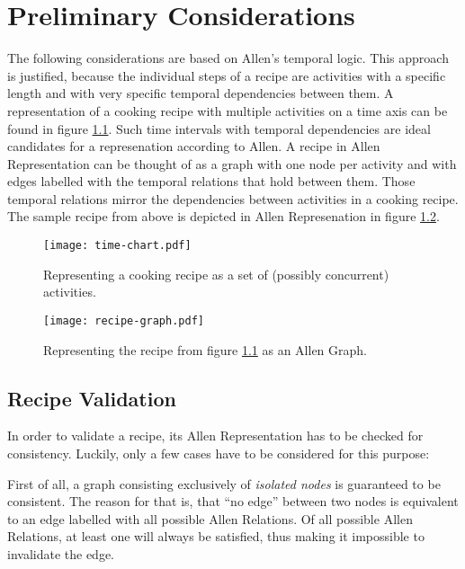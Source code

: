 \chapter{Preliminary Considerations}

    The  following considerations are based on Allen's temporal logic. This
    approach is justified, because the individual steps of a recipe are
    activities with a specific length and with very specific temporal dependencies
    between them. A representation of a cooking recipe with multiple
    activities on a time axis can be found in figure \ref{fig:time-chart}. Such
    time intervals with temporal dependencies are ideal candidates for a
    represenation according to Allen. A recipe in Allen Representation can be
    thought of as a graph with one node
    per activity and with edges
    labelled with the temporal relations that hold between them. Those temporal
    relations mirror the dependencies between activities in a cooking recipe.
    The sample recipe from above is depicted in Allen Represenation in figure
    \ref{fig:graph}.
    
    \begin{figure}[]
     \centering
     \texttt{[image: time-chart.pdf]}
     \caption[Recipe time chart]{Representing a cooking recipe as a set of
     (possibly concurrent) activities.}
     \label{fig:time-chart}
    \end{figure}
    
    \begin{figure}[]
     \centering
     \texttt{[image: recipe-graph.pdf]}
     \caption[Recipe graph]{Representing the recipe from figure
     \ref{fig:time-chart} as an Allen Graph.}
     \label{fig:graph}
    \end{figure}
    
    \section{Recipe Validation}
    
    In order to validate a recipe, its Allen Representation has to be checked
    for consistency. Luckily, only a few cases have to be considered for this
    purpose:
    
    First of all, a graph consisting exclusively of \emph{isolated nodes}
    is guaranteed to be consistent. The reason for that is, that ``no edge''
    between two nodes is equivalent to an edge labelled with all possible
    Allen Relations. Of all possible Allen Relations, at least one will always
    be satisfied, thus making it impossible to invalidate the edge.
    
